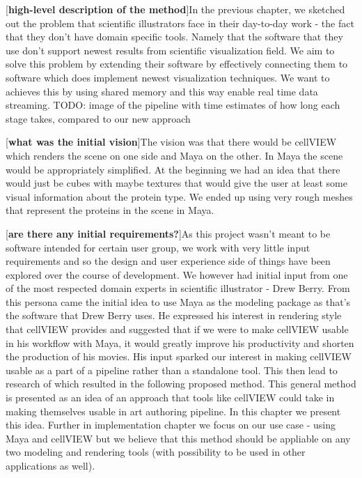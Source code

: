 \documentclass[
  digital, %
  table,   %
  nolof,     %
  nolot,     %
]{fithesis3}
\begin{document}
[\textbf{high-level description of the method}]In the previous chapter, we sketched out the problem that scientific illustrators face in their day-to-day work - the fact that they don't have domain specific tools. Namely that the software that they use don't support newest results from scientific visualization field. We aim to solve this problem by extending their software by effectively connecting them to software which does implement newest visualization techniques. We want to achieves this by using shared memory and this way enable real time data streaming.
TODO: image of the pipeline with time estimates of how long each stage takes, compared to our new approach

[\textbf{what was the initial vision}]The vision was that there would be cellVIEW which renders the scene on one side and Maya on the other. In Maya the scene would be appropriately simplified. At the beginning we had an idea that there would just be cubes with maybe textures that would give the user at least some visual information about the protein type. We ended up using very rough meshes that represent the proteins in the scene in Maya.

[\textbf{are there any initial requirements?}]As this project wasn't meant to be software intended for certain user group, we work with very little input requirements and so the design and user experience side of things have been explored over the course of development. We however had initial input from one of the most respected domain experts in scientific illustrator - Drew Berry. From this persona came the initial idea to use Maya as the modeling package as that's the software that Drew Berry uses. He expressed his interest in rendering style that cellVIEW provides and suggested that if we were to make cellVIEW usable in his workflow with Maya, it would greatly improve his productivity and shorten the production of his movies. His input sparked our interest in making cellVIEW usable as a part of a pipeline rather than a standalone tool. This then lead to research of which resulted in the following proposed method. This general method is presented as an idea of an approach that tools like cellVIEW could take in making themselves usable in art authoring pipeline. In this chapter we present this idea. Further in implementation chapter we focus on our use case - using Maya and cellVIEW but we believe that this method should be appliable on any two modeling and rendering tools (with possibility to be used in other applications as well).
\end{document}
